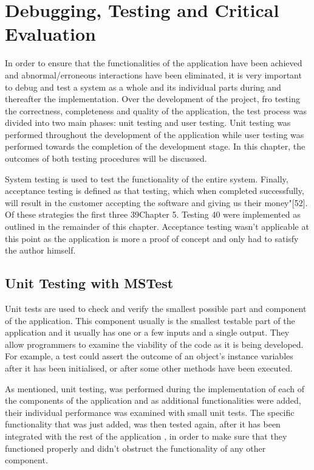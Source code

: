 \chapter{Debugging, Testing and Critical Evaluation}
\label{testing}




In order to ensure that the functionalities of the application have been achieved and abnormal/erroneous interactions have been eliminated, it is very important to debug and test a system as a whole and its individual parts during and thereafter the implementation. 
Over the development of the project, fro testing the correctness, completeness and quality of the application, the test process was divided into two main phases: unit testing\cite{unit} and user testing. Unit testing was performed throughout the development of the application while user testing was performed towards the completion of the development stage. In this chapter, the outcomes of both testing procedures will be discussed.


System testing is used to test the functionality of the entire system. Finally, acceptance testing is defined as that
testing, which when completed successfully, will result in the customer accepting
the software and giving us their money"[52]. Of these strategies the first three
39Chapter 5. Testing 40
were implemented as outlined in the remainder of this chapter. Acceptance testing wasn't applicable at this point as the application is more a proof of concept
and only had to satisfy the author himself.

\section{Unit Testing with MSTest}
\label{unit_testing}

Unit tests are used to check and verify the smallest  possible part and component of the application. This component usually is the smallest testable part of the application and it usually has one or a few inputs and a single output. They allow programmers to examine the viability of the code as it is being developed. For example, a test could assert the outcome of an object's instance variables after it has been initialised, or after some other methods have been executed.


As mentioned, unit testing, was performed during the implementation of each of the components of the application and as additional functionalities were added, their individual performance was examined with small unit tests. The specific functionality that was just added, was then tested again, after it has been integrated with the rest of the application , in order to make sure that they functioned properly and didn't obstruct the functionality of any other component.

